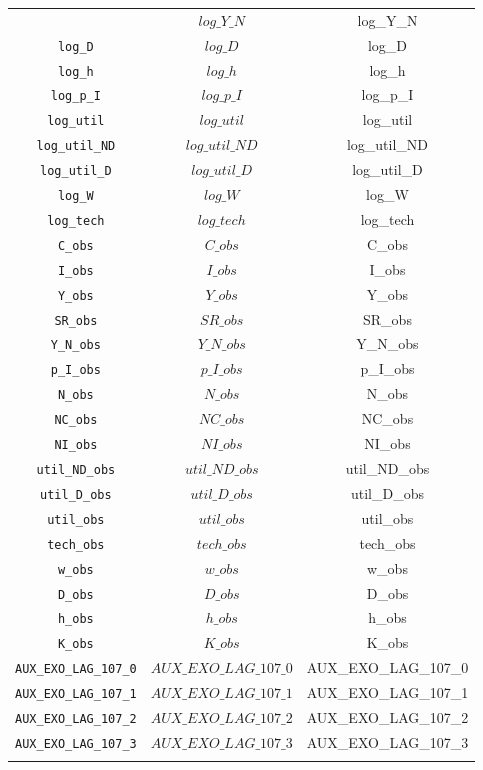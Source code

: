 \begin{center}
\begin{longtable}{ccc}
{\texttt{log\_Y\_N} & $log\_Y\_N$ & log\_Y\_N\\
\texttt{log\_D} & $log\_D$ & log\_D\\
\texttt{log\_h} & $log\_h$ & log\_h\\
\texttt{log\_p\_I} & $log\_p\_I$ & log\_p\_I\\
\texttt{log\_util} & $log\_util$ & log\_util\\
\texttt{log\_util\_ND} & $log\_util\_ND$ & log\_util\_ND\\
\texttt{log\_util\_D} & $log\_util\_D$ & log\_util\_D\\
\texttt{log\_W} & $log\_W$ & log\_W\\
\texttt{log\_tech} & $log\_tech$ & log\_tech\\
\texttt{C\_obs} & $C\_obs$ & C\_obs\\
\texttt{I\_obs} & $I\_obs$ & I\_obs\\
\texttt{Y\_obs} & $Y\_obs$ & Y\_obs\\
\texttt{SR\_obs} & $SR\_obs$ & SR\_obs\\
\texttt{Y\_N\_obs} & $Y\_N\_obs$ & Y\_N\_obs\\
\texttt{p\_I\_obs} & $p\_I\_obs$ & p\_I\_obs\\
\texttt{N\_obs} & $N\_obs$ & N\_obs\\
\texttt{NC\_obs} & $NC\_obs$ & NC\_obs\\
\texttt{NI\_obs} & $NI\_obs$ & NI\_obs\\
\texttt{util\_ND\_obs} & $util\_ND\_obs$ & util\_ND\_obs\\
\texttt{util\_D\_obs} & $util\_D\_obs$ & util\_D\_obs\\
\texttt{util\_obs} & $util\_obs$ & util\_obs\\
\texttt{tech\_obs} & $tech\_obs$ & tech\_obs\\
\texttt{w\_obs} & $w\_obs$ & w\_obs\\
\texttt{D\_obs} & $D\_obs$ & D\_obs\\
\texttt{h\_obs} & $h\_obs$ & h\_obs\\
\texttt{K\_obs} & $K\_obs$ & K\_obs\\
\texttt{AUX\_EXO\_LAG\_107\_0} & $AUX\_EXO\_LAG\_107\_0$ & AUX\_EXO\_LAG\_107\_0\\
\texttt{AUX\_EXO\_LAG\_107\_1} & $AUX\_EXO\_LAG\_107\_1$ & AUX\_EXO\_LAG\_107\_1\\
\texttt{AUX\_EXO\_LAG\_107\_2} & $AUX\_EXO\_LAG\_107\_2$ & AUX\_EXO\_LAG\_107\_2\\
\texttt{AUX\_EXO\_LAG\_107\_3} & $AUX\_EXO\_LAG\_107\_3$ & AUX\_EXO\_LAG\_107\_3\\
}
\end{longtable}
\end{center}
